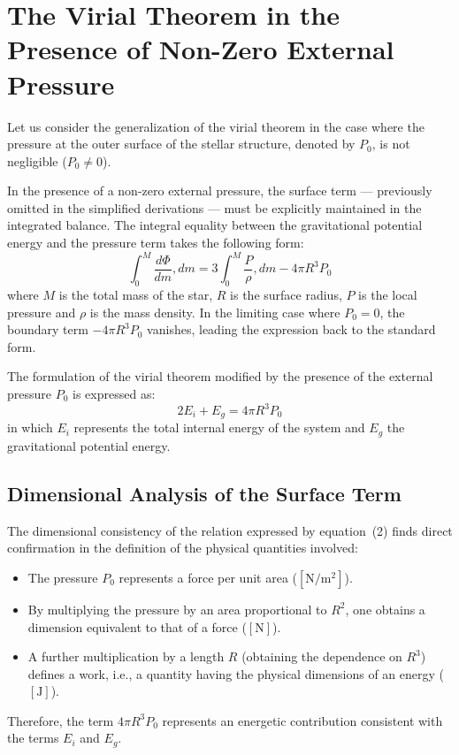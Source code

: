 \section{The Virial Theorem in the Presence of Non-Zero External Pressure}

Let us consider the generalization of the virial theorem in the case where the pressure at the outer surface of the stellar structure, denoted by $P_0$, is not negligible ($P_0 \neq 0$).

In the presence of a non-zero external pressure, the surface term — previously omitted in the simplified derivations — must be explicitly maintained in the integrated balance. The integral equality between the gravitational potential energy and the pressure term takes the following form:
\begin{equation}
\int_0^M \frac{d\Phi}{dm} , dm = 3 \int_0^M \frac{P}{\rho} , dm - 4\pi R^3 P_0
\end{equation}
where $M$ is the total mass of the star, $R$ is the surface radius, $P$ is the local pressure and $\rho$ is the mass density. In the limiting case where $P_0 = 0$, the boundary term $-4\pi R^3 P_0$ vanishes, leading the expression back to the standard form.

The formulation of the virial theorem modified by the presence of the external pressure $P_0$ is expressed as:
\begin{equation}
2 E_i + E_g = 4\pi R^3 P_0
\end{equation}
in which $E_i$ represents the total internal energy of the system and $E_g$ the gravitational potential energy.

\subsection{Dimensional Analysis of the Surface Term}
The dimensional consistency of the relation expressed by equation~(2) finds direct confirmation in the definition of the physical quantities involved:
\begin{itemize}
\item The pressure $P_0$ represents a force per unit area ($\left[\text{N}/\text{m}^2\right]$).
\item By multiplying the pressure by an area proportional to $R^2$, one obtains a dimension equivalent to that of a force ($\left[\text{N}\right]$).
\item A further multiplication by a length $R$ (obtaining the dependence on $R^3$) defines a work, i.e., a quantity having the physical dimensions of an energy ($\left[\text{J}\right]$).
\end{itemize}
Therefore, the term $4\pi R^3 P_0$ represents an energetic contribution consistent with the terms $E_i$ and $E_g$.

